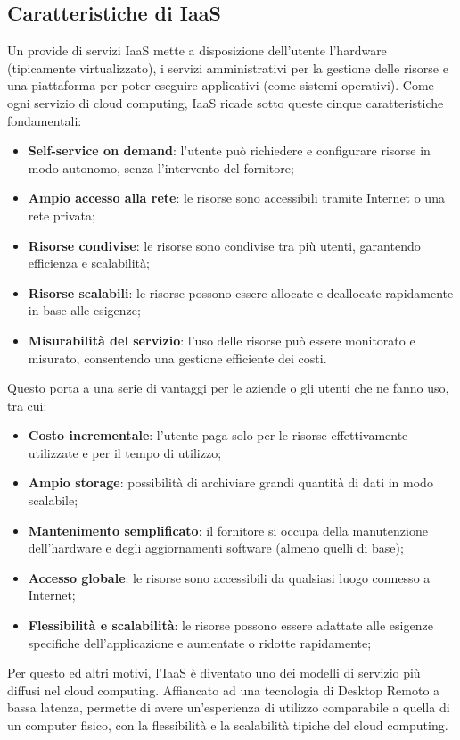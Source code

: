\documentclass[12pt,a4paper,openright,twoside]{book}
\begin{document}
\subsection{Caratteristiche di IaaS}
Un provide di servizi IaaS mette a disposizione dell'utente l'hardware (tipicamente virtualizzato), i servizi amministrativi per la gestione delle risorse e una piattaforma per poter eseguire applicativi (come sistemi operativi).
Come ogni servizio di cloud computing, IaaS ricade sotto queste cinque caratteristiche fondamentali:
\begin{itemize}
    \item \textbf{Self-service on demand}: l'utente può richiedere e configurare risorse in modo autonomo, senza l'intervento del fornitore;
    \item \textbf{Ampio accesso alla rete}: le risorse sono accessibili tramite Internet o una rete privata;
    \item \textbf{Risorse condivise}: le risorse sono condivise tra più utenti, garantendo efficienza e scalabilità;
    \item \textbf{Risorse scalabili}: le risorse possono essere allocate e deallocate rapidamente in base alle esigenze;
    \item \textbf{Misurabilità del servizio}: l'uso delle risorse può essere monitorato e misurato, consentendo una gestione efficiente dei costi.
\end{itemize}
Questo porta a una serie di vantaggi per le aziende o gli utenti che ne fanno uso, tra cui:
\begin{itemize}
    \item \textbf{Costo incrementale}: l'utente paga solo per le risorse effettivamente utilizzate e per il tempo di utilizzo;
    \item \textbf{Ampio storage}: possibilità di archiviare grandi quantità di dati in modo scalabile;
    \item \textbf{Mantenimento semplificato}: il fornitore si occupa della manutenzione dell'hardware e degli aggiornamenti software (almeno quelli di base);
    \item \textbf{Accesso globale}: le risorse sono accessibili da qualsiasi luogo connesso a Internet;
    \item \textbf{Flessibilità e scalabilità}: le risorse possono essere adattate alle esigenze specifiche dell'applicazione e aumentate o ridotte rapidamente;
\end{itemize}   
Per questo ed altri motivi, l'IaaS è diventato uno dei modelli di servizio più diffusi nel cloud computing. Affiancato ad una tecnologia di Desktop Remoto a bassa latenza, permette di avere un'esperienza di utilizzo comparabile a quella di un computer fisico, con la flessibilità e la scalabilità tipiche del cloud computing.
\end{document}
